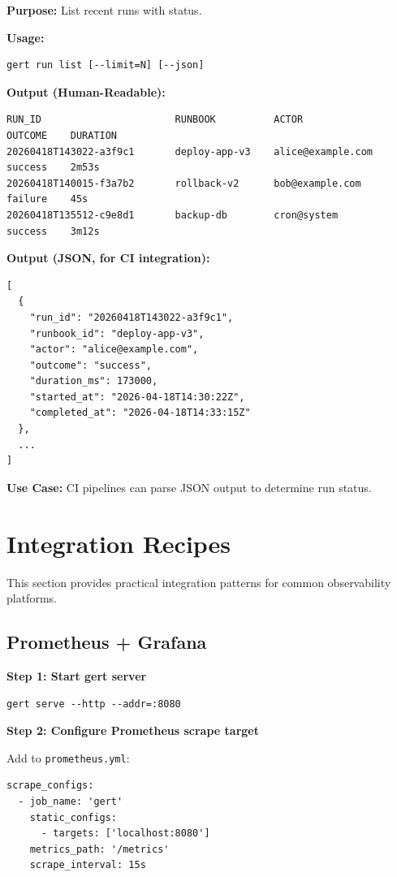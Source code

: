 \textbf{Purpose:} List recent runs with status.

\textbf{Usage:}
\begin{verbatim}
gert run list [--limit=N] [--json]
\end{verbatim}

\textbf{Output (Human-Readable):}
\begin{verbatim}
RUN_ID                       RUNBOOK          ACTOR                OUTCOME    DURATION
20260418T143022-a3f9c1       deploy-app-v3    alice@example.com    success    2m53s
20260418T140015-f3a7b2       rollback-v2      bob@example.com      failure    45s
20260418T135512-c9e8d1       backup-db        cron@system          success    3m12s
\end{verbatim}

\textbf{Output (JSON, for CI integration):}
\begin{verbatim}
[
  {
    "run_id": "20260418T143022-a3f9c1",
    "runbook_id": "deploy-app-v3",
    "actor": "alice@example.com",
    "outcome": "success",
    "duration_ms": 173000,
    "started_at": "2026-04-18T14:30:22Z",
    "completed_at": "2026-04-18T14:33:15Z"
  },
  ...
]
\end{verbatim}

\textbf{Use Case:} CI pipelines can parse JSON output to determine run status.

\section{Integration Recipes}

This section provides practical integration patterns for common observability platforms.

\subsection{Prometheus + Grafana}

\textbf{Step 1: Start gert server}
\begin{verbatim}
gert serve --http --addr=:8080
\end{verbatim}

\textbf{Step 2: Configure Prometheus scrape target}

Add to \texttt{prometheus.yml}:
\begin{verbatim}
scrape_configs:
  - job_name: 'gert'
    static_configs:
      - targets: ['localhost:8080']
    metrics_path: '/metrics'
    scrape_interval: 15s
\end{verbatim}

